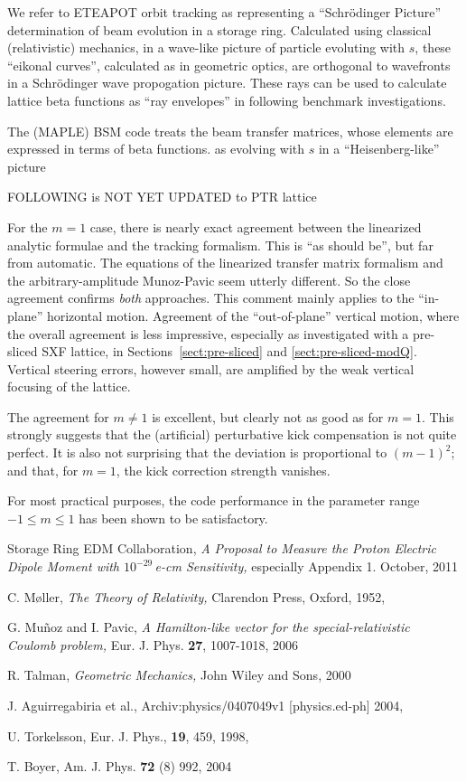 \documentclass[12pt]{article}
\begin{document}
We refer to ETEAPOT orbit tracking as representing  a ``Schr\"odinger Picture'' determination of beam evolution in a 
storage ring.  Calculated using classical (relativistic) mechanics, in a wave-like picture of particle evoluting with $s$, 
these ``eikonal curves'', calculated as in geometric optics, are orthogonal to wavefronts in a Schr\"odinger wave 
propogation picture.  These rays can be used to calculate lattice beta functions as ``ray envelopes'' in following 
benchmark investigations. 

The (MAPLE) BSM code treats the beam transfer matrices, whose elements are expressed in terms of beta functions.
as evolving with $s$ in a ``Heisenberg-like'' picture  
 

FOLLOWING is NOT YET UPDATED to PTR lattice

For the $m=1$ case, there is nearly exact agreement between the linearized analytic formulae and the tracking formalism. 
This is ``as should be'', but far from automatic. The equations of the linearized transfer matrix formalism and the 
arbitrary-amplitude Munoz-Pavic seem utterly different. So the close agreement confirms \emph{both} approaches.
This comment mainly applies to the ``in-plane'' horizontal motion. Agreement of the ``out-of-plane'' vertical
motion, where the overall agreement is less impressive, especially as investigated with a pre-sliced SXF lattice,
in Sections~\ref{sect:pre-sliced} and \ref{sect:pre-sliced-modQ}. Vertical steering errors, however small, are 
amplified by the weak vertical focusing of the lattice. 

The agreement for $m\ne1$ is excellent, but clearly not as good as for $m=1$. This strongly suggests that the 
(artificial) perturbative kick compensation is not quite perfect. It is also not surprising that the deviation 
is proportional to $(m-1)^2$; and that, for $m=1$, the kick correction strength vanishes.

For most practical purposes, the code performance in the parameter range $-1\le m\le 1$ has been shown to 
be satisfactory. 

\clearpage

\begin{thebibliography}{99}
Storage Ring EDM Collaboration, \emph{A Proposal to Measure the
Proton Electric Dipole Moment with $10^{-29}\,$e-cm Sensitivity,}
especially Appendix 1. October, 2011

C. M\o ller, \emph{The Theory of Relativity,} Clarendon Press,
Oxford, 1952, 

G. Mu\~{n}oz and I. Pavic, \emph{A Hamilton-like vector for
the special-relativistic Coulomb problem,} 
Eur. J. Phys. {\bf 27}, 1007-1018, 2006

R. Talman, \emph{Geometric Mechanics,} John Wiley and Sons, 2000

J. Aguirregabiria et al., 
Archiv:physics/0407049v1 [physics.ed-ph] 2004, 

U. Torkelsson, Eur. J. Phys., {\bf 19}, 459, 1998, 

T. Boyer, Am. J. Phys. {\bf 72} (8) 992, 2004

\end{thebibliography}
\end{document}
